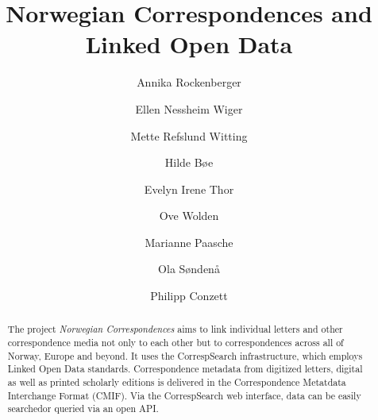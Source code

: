 \documentclass[runningheads]{llncs}
\begin{document}
%
\title{Norwegian Correspondences and\\Linked Open Data}
%
%
\author{Annika Rockenberger \and
Ellen Nessheim Wiger
\and Mette Refslund Witting 
\and Hilde Bøe 
\and Evelyn Irene Thor
\and Ove Wolden
\and Marianne Paasche
\and Ola Søndenå
\and Philipp Conzett}
%
%

%
\maketitle              %
%
\begin{abstract}
The project \textit{Norwegian Correspondences} aims to link individual letters and other correspondence media not only to each other but to correspondences across all of Norway, Europe and beyond. It uses the CorrespSearch infrastructure, which employs Linked
Open Data standards. Correspondence metadata from digitized letters, digital as well as printed scholarly editions is delivered in the Correspondence Metatdata Interchange Format (CMIF). Via the CorrespSearch web interface, data can be easily searched\textemdash or queried via an open API. 

\end{abstract}
%
\end{document}
